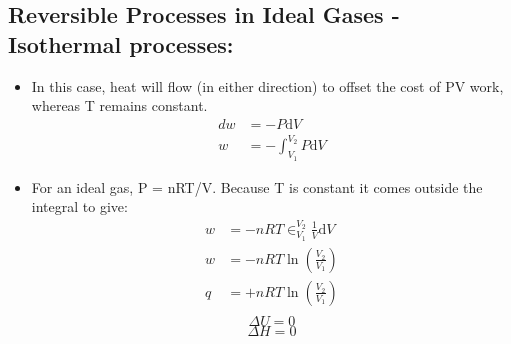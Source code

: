 \documentclass[10pt]{article}
\begin{document}
\subsection*{Reversible Processes in Ideal Gases - Isothermal processes:}
\begin{itemize}
    \item In this case, heat will flow (in either direction) to offset the cost of PV work, whereas T remains constant.
    \begin{align*}
        dw &= -P\text{d}V \\
        w &= -\int_{V_1}^{V_2} P\text{d}V
    \end{align*}
    \item For an ideal gas, P = nRT/V.  Because T is constant it comes outside the integral to give:
    \begin{align*}
        w &= -nRT\in_{V_1}^{V_2}\frac{1}{V} \text{d}V \\
        w &= -nRT\ln\left(\frac{V_2}{V_1}\right)\\
        q &= +nRT\ln\left(\frac{V_2}{V_1}\right)\\
    \end{align*}
    \[\Delta U = 0\]
    \[\Delta H = 0\]
\end{itemize}
\end{document}
